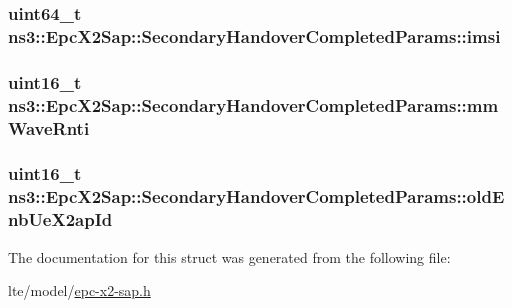 \subsubsection[{\texorpdfstring{imsi}{imsi}}]{\setlength{\rightskip}{0pt plus 5cm}uint64\+\_\+t ns3\+::\+Epc\+X2\+Sap\+::\+Secondary\+Handover\+Completed\+Params\+::imsi}\hypertarget{structns3_1_1EpcX2Sap_1_1SecondaryHandoverCompletedParams_a23af85572be34179f2f5b7a3713553fe}{}\label{structns3_1_1EpcX2Sap_1_1SecondaryHandoverCompletedParams_a23af85572be34179f2f5b7a3713553fe}
\subsubsection[{\texorpdfstring{mm\+Wave\+Rnti}{mmWaveRnti}}]{\setlength{\rightskip}{0pt plus 5cm}uint16\+\_\+t ns3\+::\+Epc\+X2\+Sap\+::\+Secondary\+Handover\+Completed\+Params\+::mm\+Wave\+Rnti}\hypertarget{structns3_1_1EpcX2Sap_1_1SecondaryHandoverCompletedParams_a0e049d9cc4f59455c19758bf0584d636}{}\label{structns3_1_1EpcX2Sap_1_1SecondaryHandoverCompletedParams_a0e049d9cc4f59455c19758bf0584d636}
\subsubsection[{\texorpdfstring{old\+Enb\+Ue\+X2ap\+Id}{oldEnbUeX2apId}}]{\setlength{\rightskip}{0pt plus 5cm}uint16\+\_\+t ns3\+::\+Epc\+X2\+Sap\+::\+Secondary\+Handover\+Completed\+Params\+::old\+Enb\+Ue\+X2ap\+Id}\hypertarget{structns3_1_1EpcX2Sap_1_1SecondaryHandoverCompletedParams_a1dc13fce760bdb8f39665caec7db65a4}{}\label{structns3_1_1EpcX2Sap_1_1SecondaryHandoverCompletedParams_a1dc13fce760bdb8f39665caec7db65a4}


The documentation for this struct was generated from the following file\+:\begin{DoxyCompactItemize}
\item 
lte/model/\hyperlink{epc-x2-sap_8h}{epc-\/x2-\/sap.\+h}\end{DoxyCompactItemize}
